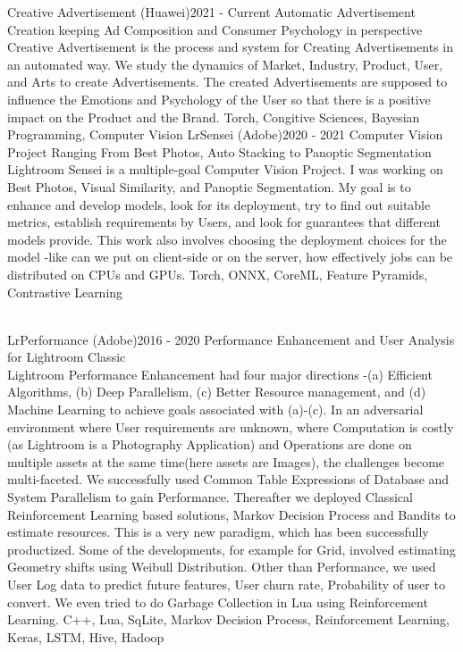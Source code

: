 %
%
%


\begin{projects}
	\project
	{Creative Advertisement (Huawei)}{2021 - Current}
	{Automatic Advertisement Creation keeping Ad Composition and Consumer Psychology in perspective}
	{\\Creative Advertisement is the process and system for Creating Advertisements in an automated way. We study the dynamics of Market, Industry, Product, User, and  Arts to create Advertisements. The created Advertisements are supposed to influence the Emotions and Psychology of the User so that there is a positive impact on the Product and the Brand.}
	{Torch,  Congitive Sciences, Bayesian Programming, Computer Vision}
	\project
	{LrSensei (Adobe)}{2020 - 2021}
	{Computer Vision Project Ranging From Best Photos, Auto Stacking to Panoptic Segmentation}
	{\\Lightroom Sensei is a multiple-goal Computer Vision Project. I was working on Best Photos, Visual Similarity, and Panoptic Segmentation. My goal is to enhance and develop models, look for its deployment, try to find out suitable metrics, establish requirements by Users, and look for guarantees that different models provide. This work also involves choosing the deployment choices for the model -like can we put on client-side or on the server, how effectively jobs can be distributed on CPUs and GPUs. }
	{Torch, ONNX, CoreML, Feature Pyramids, Contrastive Learning}
				
	\project
	{\\LrPerformance (Adobe)}{2016 - 2020}
	{Performance Enhancement and User Analysis for Lightroom Classic}
	{\\Lightroom Performance Enhancement had four major directions -(a) Efficient Algorithms, (b) Deep Parallelism, (c) Better Resource management, and (d) Machine Learning to achieve goals associated with (a)-(c). In an adversarial environment where User requirements are unknown, where Computation is costly (as Lightroom is a Photography Application) and Operations are done on multiple assets at the same time(here assets are Images), the challenges become multi-faceted. We successfully used Common Table Expressions of Database and System Parallelism to gain Performance. Thereafter we deployed Classical Reinforcement Learning based solutions, Markov Decision Process and Bandits to estimate resources. This is a very new paradigm, which has been successfully productized. Some of the developments, for example for Grid, involved estimating Geometry shifts using Weibull Distribution. Other than Performance, we used User Log data to predict future features, User churn rate, Probability of user to convert. We even tried to do Garbage Collection in Lua using Reinforcement Learning.}
	{C++, Lua, SqLite, Markov Decision Process, Reinforcement Learning, Keras, LSTM, Hive, Hadoop}
	

\end{projects}
